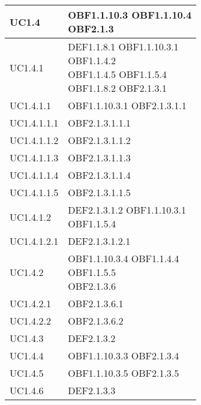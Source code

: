 \documentclass{scalatekids-article}
\begin{document}
\begin{longtable}[H]{|p{5.5cm}|p{5.5cm}|}
  \hline
  UC1.4 & \multiLineCell[t]{OBF1.1.10.3 OBF1.1.10.4\\OBF2.1.3}\\
  \hline
  UC1.4.1 & \multiLineCell[t]{DEF1.1.8.1 OBF1.1.10.3.1\\OBF1.1.4.2\\OBF1.1.4.5 OBF1.1.5.4\\OBF1.1.8.2 OBF2.1.3.1\\}\\
  \hline
  UC1.4.1.1 & \multiLineCell[t]{OBF1.1.10.3.1 OBF2.1.3.1.1\\}\\
  \hline
  UC1.4.1.1.1 & \multiLineCell[t]{OBF2.1.3.1.1.1\\}\\
  \hline
  UC1.4.1.1.2 & \multiLineCell[t]{OBF2.1.3.1.1.2\\}\\
  \hline
  UC1.4.1.1.3 & \multiLineCell[t]{OBF2.1.3.1.1.3\\}\\
  \hline
  UC1.4.1.1.4 & \multiLineCell[t]{OBF2.1.3.1.1.4\\}\\
  \hline
  UC1.4.1.1.5 & \multiLineCell[t]{OBF2.1.3.1.1.5\\}\\
  \hline
  UC1.4.1.2 & \multiLineCell[t]{DEF2.1.3.1.2 OBF1.1.10.3.1\\OBF1.1.5.4}\\
  \hline
  UC1.4.1.2.1 & \multiLineCell[t]{DEF2.1.3.1.2.1\\}\\
  \hline
  UC1.4.2 & \multiLineCell[t]{OBF1.1.10.3.4 OBF1.1.4.4\\OBF1.1.5.5\\OBF2.1.3.6}\\
  \hline
  UC1.4.2.1 & \multiLineCell[t]{OBF2.1.3.6.1\\}\\
  \hline
  UC1.4.2.2 & \multiLineCell[t]{OBF2.1.3.6.2\\}\\
  \hline
  UC1.4.3 & \multiLineCell[t]{DEF2.1.3.2\\}\\
  \hline
  UC1.4.4 & \multiLineCell[t]{OBF1.1.10.3.3 OBF2.1.3.4\\}\\
  \hline
  UC1.4.5 & \multiLineCell[t]{OBF1.1.10.3.5 OBF2.1.3.5\\}\\
  \hline
  UC1.4.6 & \multiLineCell[t]{DEF2.1.3.3\\}\\

\end{longtable}
\end{document}
